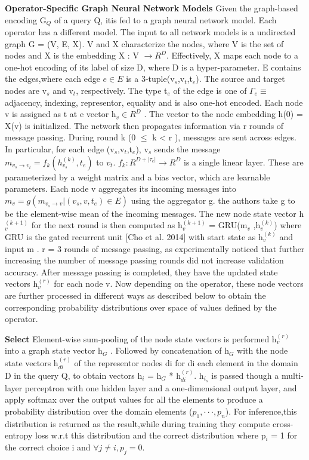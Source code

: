 \documentclass{article}
\begin{document}
\textbf{Operator-Specific Graph Neural Network Models} Given the graph-based encoding G$_Q$ of a query Q, itis fed to a graph neural network model. Each operator has a different model. The input to all network models is a undirected graph G = (V, E, X). V and X characterize the nodes, where V is the set of nodes and X is the embedding X : V $\rightarrow R^D$. Effectively, X maps each node to a one-hot encoding of its label of size D, where D is a hyper-parameter. E contains the edges,where each edge $e\in E $ is a 3-tuple(v$_s$,v$_t$,t$_e$). The source and target nodes are v$_s$ and v$_t$, respectively. The type t$_e$ of the edge is one of $\Gamma _e \equiv$ {adjacency, indexing, representor, equality} and is also one-hot encoded. Each node v is assigned as t at e vector h$_v \in R^D$ . The vector to the node embedding h(0) = X(v) is initialized. The network then propagates information via r rounds of message passing. During round k (0 $\leq$ k < r ), messages are sent across edges. In particular, for each edge (v$_s$,v$_t$,t$_e$), v$_s$ sends the message $m_{v_s \rightarrow v_t} = f_k(h^{(k)}_{v_s},t_e )$ to $v_t$. $f_k : R^{D+|\tau_e|} → R^D$ is a single linear layer. These are parameterized by a weight matrix and a bias vector, which are learnable parameters. Each node v aggregates its incoming messages into $m_{v} = g({m_{v_s \rightarrow v}|(v_s,v,t_e) \in E})$ using the aggregator g. the authors take g to be the element-wise mean of the incoming messages. The new node state vector h$^{(k+1)}_v$ for the next round is then computed as h$^{(k+1)}_v$ = GRU(m$_v$ ,h$^{(k)}_v$) where GRU is the gated recurrent unit [Cho et al. 2014] with start state as h$^{(k)}_v$ and input m . r = 3 rounds of message passing, as experimentally noticed that further increasing the number of message passing rounds did not increase validation accuracy. After message passing is completed, they have the updated state vectors h$^{(r)}_v$ for each node v. Now depending on the operator, these node vectors are further processed in different ways as described below to obtain the corresponding probability distributions over space of values defined by the operator.

\textbf{Select} Element-wise sum-pooling of the node state vectors is performed h$^{(r)}_v$ into a graph state vector h$_G$ . Followed by concatenation of h$_G$ with the node state vectors h$^{(r)}_{di}$ of the representor nodes di for di each element in the domain D in the query Q, to obtain vectors h$_i$ = h$_G$ * h$^{(r)}_{di}$. h$_{i_s}$ is passed though a multi-layer perceptron with one hidden layer and a one-dimensional output layer, and apply softmax over the output values for all the elements to produce a probability distribution over the domain elements ($p_1,··· ,p_n$). For inference,this distribution is returned as the result,while during training they compute cross-entropy loss w.r.t this distribution and the correct distribution where p$_i$ = 1 for the correct choice i and $\forall j \neq i, p_j = 0$.
\end{document}
